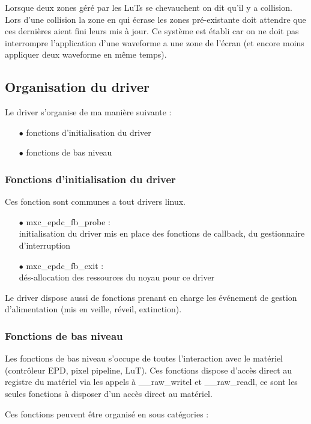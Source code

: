 Lorsque deux zones géré par les LuTs se chevauchent on dit qu'il y a collision. Lors d'une collision 
la zone en qui écrase les zones pré-existante doit attendre que ces dernières aient fini leurs mis à jour. Ce système est établi car on ne doit pas interrompre l'application d'une waveforme a une zone de l'écran (et encore moins appliquer deux waveforme en même temps).
\subsection{Organisation du driver}

Le driver s'organise de ma manière suivante : 
	\begin{itemize}
		\item[$\bullet$] fonctions d'initialisation du driver
		\item[$\bullet$] fonctions de bas niveau
	\end{itemize}
	
\subsubsection{Fonctions d'initialisation du driver} %

	Ces fonction sont communes a tout drivers linux.
	\begin{itemize}
		\item[$\bullet$] mxc\_epdc\_fb\_probe : \\
		initialisation du driver mis en place des fonctions de callback, du gestionnaire d'interruption
		\item[$\bullet$] mxc\_epdc\_fb\_exit :\\
		dés-allocation des ressources du noyau pour ce driver
	\end{itemize}
	Le driver dispose aussi de fonctions prenant en charge les événement de gestion d'alimentation (mis en veille, réveil, extinction).
	
\subsubsection{Fonctions de bas niveau}

Les fonctions de bas niveau s'occupe de toutes l'interaction avec le matériel (contrôleur EPD, pixel pipeline, LuT).
Ces fonctions dispose d'accès direct au registre du matériel via les appels à \_\_raw\_writel et \_\_raw\_readl, ce sont les seules fonctions à disposer d'un accès direct au matériel.


Ces fonctions peuvent être organisé en  sous catégories : 

